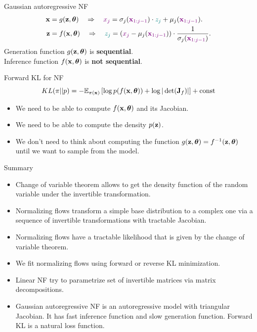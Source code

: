 \begin{frame}{Gaussian autoregressive NF}
	\vspace{-0.2cm}
	\begin{align*}
		\mathbf{x} &= g(\mathbf{z}, \boldsymbol{\theta}) \quad \Rightarrow \quad {\color{violet} x_j} = \sigma_j ({\color{violet} \mathbf{x}_{1:j-1}}) \cdot {\color{teal} z_j} + \mu_j({\color{violet} \mathbf{x}_{1:j-1}}). \\
		\mathbf{z} &= f(\mathbf{x}, \boldsymbol{\theta}) \quad \Rightarrow \quad {\color{teal} z_j} = \left({\color{violet}x_j} - \mu_j({\color{violet}\mathbf{x}_{1:j-1}}) \right) \cdot \frac{1}{ \sigma_j ({\color{violet}\mathbf{x}_{1:j-1}})}.
	\end{align*}
	Generation function $g(\mathbf{z}, \boldsymbol{\theta})$ is \textbf{sequential}. \\ Inference function $f(\mathbf{x}, \boldsymbol{\theta})$ is \textbf{not sequential}.

	\begin{block}{Forward KL for NF}
		\vspace{-0.5cm}
		\[
			KL(\pi || p)  = - \mathbb{E}_{\pi(\mathbf{x})} \left[\log p(f(\mathbf{x}, \boldsymbol{\theta})) + \log  |\det (\mathbf{J}_f)|\right] + \text{const} 
		\]
		\vspace{-0.5cm}
		\begin{itemize}
			\item We need to be able to compute $f(\mathbf{x}, \boldsymbol{\theta})$ and its Jacobian.
			\item We need to be able to compute the density $p(\mathbf{z})$.
			\item We don’t need to think about computing the function $g(\mathbf{z}, \boldsymbol{\theta}) = f^{-1}(\mathbf{z}, \boldsymbol{\theta})$ until we want to sample from the model.
		\end{itemize}
	\end{block}
\end{frame}
\begin{frame}{Summary}
	\begin{itemize}
		\item Change of variable theorem allows to get the density function of the random variable under the invertible transformation.
		\vfill
		\item Normalizing flows transform a simple base distribution to a complex one via a sequence of invertible transformations with tractable Jacobian.
		\vfill
		\item Normalizing flows have a tractable likelihood that is given by the change of variable theorem.
		\vfill
		\item We fit normalizing flows using forward or reverse KL minimization. 
		\vfill 
		\item Linear NF try to parametrize set of invertible matrices via matrix decompositions.
		\vfill
		\item Gaussian autoregressive NF is an autoregressive model with triangular Jacobian. It has fast inference function and slow generation function. Forward KL is a natural loss function.
	\end{itemize}
\end{frame}
 